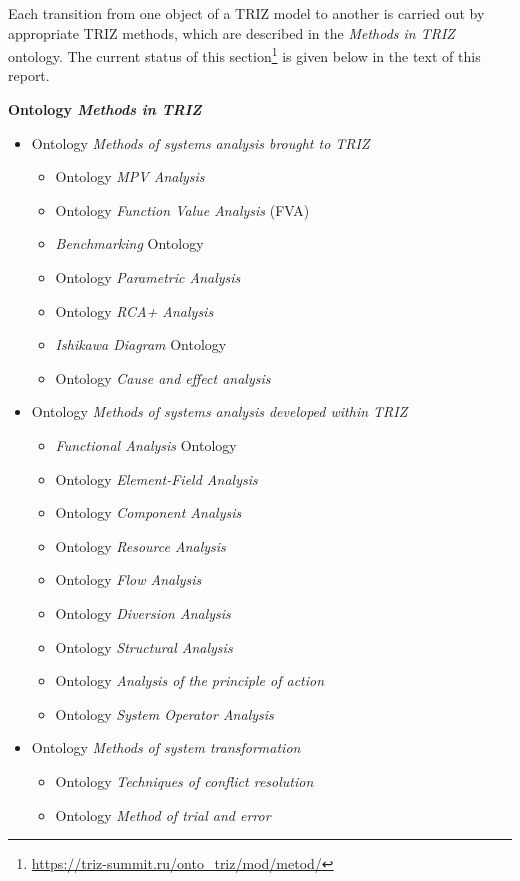 \documentclass[11pt,a4paper]{article}
\begin{document}
Each transition from one object of a TRIZ model to another is carried out by
appropriate TRIZ methods, which are described in the \emph{Methods in TRIZ}
ontology.  The current status of this
section\footnote{\url{https://triz-summit.ru/onto_triz/mod/metod/}} is given
below in the text of this report.

\textbf{Ontology \emph{Methods in TRIZ}}
\begin{itemize}
\item Ontology \emph{Methods of systems analysis brought to TRIZ}
  \begin{itemize}[noitemsep]
  \item Ontology \emph{MPV Analysis} 
  \item Ontology \emph{Function Value Analysis} (FVA) 
  \item \emph{Benchmarking} Ontology
  \item Ontology \emph{Parametric Analysis}
  \item Ontology \emph{RCA+ Analysis} 
  \item \emph{Ishikawa Diagram} Ontology
  \item Ontology \emph{Cause and effect analysis}
  \end{itemize}
\item Ontology \emph{Methods of systems analysis developed within TRIZ}
  \begin{itemize}[noitemsep]
  \item \emph{Functional Analysis} Ontology
  \item Ontology \emph{Element-Field Analysis}
  \item Ontology \emph{Component Analysis}
  \item Ontology \emph{Resource Analysis}
  \item Ontology \emph{Flow Analysis}
  \item Ontology \emph{Diversion Analysis}
  \item Ontology \emph{Structural Analysis}
  \item Ontology \emph{Analysis of the principle of action} 
  \item Ontology \emph{System Operator Analysis}
  \end{itemize}
\item Ontology \emph{Methods of system transformation}
  \begin{itemize}[noitemsep]
  \item Ontology \emph{Techniques of conflict resolution}
  \item Ontology \emph{Method of trial and error}

\end{itemize}
\end{itemize}
\end{document}
